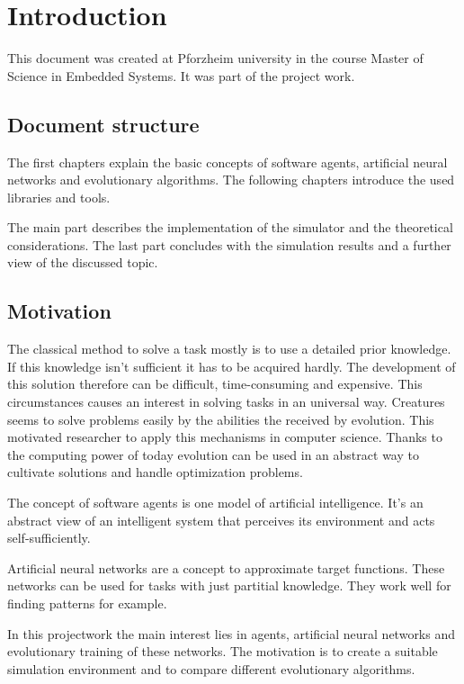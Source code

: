 \documentclass[10pt,a4paper,DIV=11]{scrreprt}
\begin{document}
\chapter{Introduction}
This document was created at Pforzheim university in the course Master of Science in Embedded Systems.
It was part of the project work.

\section{Document structure}
The first chapters explain the basic concepts of software agents, artificial neural networks and evolutionary algorithms.
The following chapters introduce the used libraries and tools.

The main part describes the implementation of the simulator and the theoretical considerations. The last part concludes with the simulation results and a further view of the discussed topic.

\section{Motivation}
The classical method to solve a task mostly is to use a detailed prior knowledge. If this knowledge isn't sufficient it has to be acquired hardly. The development of this solution therefore can be difficult, time-consuming and expensive.
This circumstances causes an interest in solving tasks in an universal way. Creatures seems to solve problems easily by the abilities the received by evolution. This motivated researcher to apply this mechanisms in computer science. Thanks to the computing power of today evolution can be used in an abstract way to cultivate solutions and handle optimization problems.

The concept of software agents is one model of artificial intelligence. It's an abstract view of an intelligent system that perceives its environment and acts self-sufficiently.

Artificial neural networks are a concept to approximate target functions. These networks can be used for tasks with just partitial knowledge.
They work well for finding patterns for example.

In this projectwork the main interest lies in agents, artificial neural networks and evolutionary training of these networks.
The motivation is to create a suitable simulation environment and to compare different evolutionary algorithms.
\end{document}
